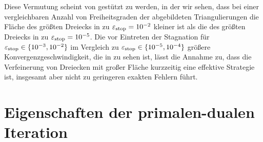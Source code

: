 Diese Vermutung scheint von  gestützt zu werden, in der
wir sehen, dass bei einer vergleichbaren Anzahl von Freiheitsgraden der
abgebildeten Triangulierungen die Fläche des größten Dreiecks in
 zu $\varepsilon_{\textup{stop}}=10^{-2}$ kleiner ist als die des
größten Dreiecks in  zu $\varepsilon_{\textup{stop}}=10^{-5}$. 
Die vor Eintreten der Stagnation für $\varepsilon_{\textup{stop}}\in\{10^{-3},10^{-2}\}$ im
Vergleich zu $\varepsilon_{\textup{stop}}\in\{10^{-5},10^{-4}\}$ größere
Konvergenzgeschwindigkeit, die in  zu sehen
ist, lässt die Annahme zu, dass die Verfeinerung von Dreiecken mit großer
Fläche kurzzeitig eine effektive Strategie ist, insgesamt aber nicht zu
geringeren exakten Fehlern führt.


\section{Eigenschaften der primalen-dualen Iteration}
\label{sec:experimentsPrimalDualIteration}

